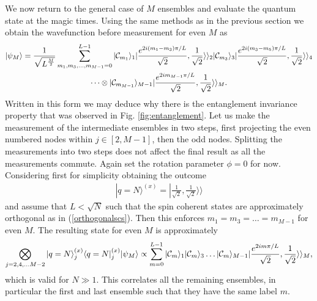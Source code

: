 \documentclass{WileyMSP-template}
\begin{document}
We now return to the general case of $ M $ ensembles and evaluate the quantum state at the magic times.  Using the same methods as in the previous section we obtain the wavefunction before measurement for even $ M $ as
%
\begin{multline}
|\psi_M \rangle=\frac{1}{\sqrt{L^{\frac{M}{2}}}}\sum_{m_1,m_3,\ldots,m_{M-1}=0}^{L-1}   | {\cal C}_{m_1}  \rangle_1  |\frac{e^{2 i(m_{1}-m_{3})\pi/L }}{\sqrt{2}},\frac{1}{\sqrt{2}}\rangle\rangle_2 | {\cal C}_{m_3} \rangle_3
|\frac{e^{2 i(m_{3}-m_{5})\pi/L }}{\sqrt{2}},\frac{1}{\sqrt{2}}\rangle\rangle_4  \\
\dots \otimes  | {\cal C}_{m_{M-1}} \rangle_{M-1} |\frac{e^{2 i m_{M-1}\pi/L }}{\sqrt{2}},\frac{1}{\sqrt{2}}\rangle\rangle_{M} .
\label{evenpsiMcat}
\end{multline}
%
Written in this form we may deduce why there is the entanglement invariance property that was observed in Fig. \ref{fig:entanglement}.  Let us make the measurement of the intermediate ensembles in two steps, first projecting the even numbered nodes within $ j \in [2,M-1] $, then the odd nodes. Splitting the measurements into two steps does not affect the final result as all the measurements commute.  Again set the rotation parameter $ \phi = 0 $ for now.  Considering first for
simplicity obtaining the outcome
%
\begin{align}
|q= N \rangle^{(x)} = | \frac{1}{\sqrt{2}}, \frac{1}{\sqrt{2}} \rangle \rangle
\end{align}
%
and assume that $L < \sqrt{N} $ such that the spin coherent states are approximately orthogonal as in (\ref{orthogonalscs}).  Then this enforces $ m_1 = m_3 = \dots = m_{M-1} $ for even $ M $.  The resulting state for even $ M $ is approximately
%
\begin{equation}
\bigotimes_{j=2,4,\dots M-2} |q= N \rangle_j^{(x)} \langle q = N |_j^{(x)}  |\psi_M \rangle \propto
\sum_{m=0}^{L-1} | {\cal C}_{m}  \rangle_1 | {\cal C}_{m}  \rangle_3 \dots | {\cal C}_{m}  \rangle_{M-1} |\frac{e^{2 i m \pi/L }}{\sqrt{2}},\frac{1}{\sqrt{2}}\rangle\rangle_{M} ,
\end{equation}
%
which is valid for $ N \gg 1 $.
This correlates all the remaining ensembles, in particular the first and last ensemble such that they have the same label $ m $.
\end{document}
